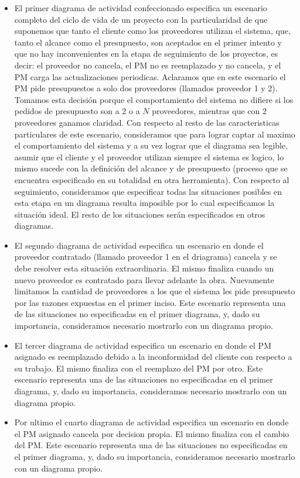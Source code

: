 \begin{itemize}
  \item El primer diagrama de actividad confeccionado especifica un escenario completo del ciclo de vida de un proyecto con la particularidad de que suponemos que tanto el cliente como los proveedores utilizan el sistema, que, tanto el alcance como el presupuesto, son aceptados en el primer intento y que no hay inconvenientes en la etapa de seguimiento de los proyectos, es decir: el proveedor no cancela, el PM no es reemplazado y no cancela, y el PM carga las actualizaciones periodicas. Aclaramos que en este escenario el PM pide presupuestos a solo dos proveedores (llamados proveedor 1 y 2). Tomamos esta decisión porque el comportamiento del sistema no difiere si los pedidos de presupuesto son a 2 o a $N$ proveedores, mientras que con 2 proveedores ganamos claridad. Con respecto al resto de las caracteristicas particulares de este escenario, consideramos que para lograr captar al maximo el comportamiento del sistema y a su vez lograr que el diagrama sea legible, asumir que el cliente y el proveedor utilizan siempre el sistema es logico, lo mismo sucede con la definición del alcance y de presupuesto (proceso que se encuentra especificado en su totalidad en otra herramienta). Con respecto al seguimiento, consideramos que especificar todas las situaciones posibles en esta etapa en un diagrama resulta imposible por lo cual especificamos la situación ideal. El resto de los situaciones serán especificados en otros diagramas.

  \item El segundo diagrama de actividad especifica un escenario en donde el proveedor contratado (llamado proveedor 1 en el driagrama) cancela y se debe resolver esta situación extraordinaria. El mismo finaliza cuando un nuevo proveedor es contratado para llevar adelante la obra. Nuevamente limitamos la cantidad de proveedores a los que el sistema les pide presupuesto por las razones expuestas en el primer inciso. Este escenario representa una de las situaciones no especificadas en el primer diagrama, y, dado su importancia, consideramos necesario mostrarlo con un diagrama propio.

  \item El tercer diagrama de actividad especifica un escenario en donde el PM asignado es reemplazado debido a la inconformidad del cliente con respecto a su trabajo. El mismo finaliza con el reemplazo del PM por otro. Este escenario representa una de las situaciones no especificadas en el primer diagrama, y, dado su importancia, consideramos necesario mostrarlo con un diagrama propio.

  \item Por ultimo el cuarto diagrama de actividad especifica un escenario en donde el PM asignado cancela por decision propia. El mismo finaliza con el cambio del PM. Este escenario representa una de las situaciones no especificadas en el primer diagrama, y, dado su importancia, consideramos necesario mostrarlo con un diagrama propio.

\end{itemize}

